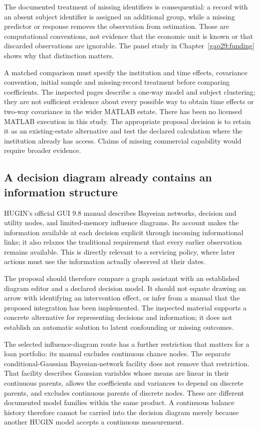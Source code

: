 The documented treatment of missing identifiers is consequential: a record
with an absent subject identifier is assigned an additional group, while a
missing predictor or response removes the observation from estimation.
Those are computational conventions, not evidence that the economic unit
is known or that discarded observations are ignorable. The panel study in
Chapter~\ref{gap29:funding} shows why that distinction matters.

A matched comparison must specify the institution and time effects,
covariance convention, initial sample and missing-record treatment before
comparing coefficients. The inspected pages describe a one-way model and
subject clustering; they are not sufficient evidence about every possible
way to obtain time effects or two-way covariance in the wider MATLAB estate.
There has been no licensed MATLAB execution in this study. The appropriate
proposal decision is to retain it as an existing-estate alternative and
test the declared calculation where the institution already has access.
Claims of missing commercial capability would require broader evidence.

\subsection{A decision diagram already contains an information structure}
HUGIN's official GUI 9.8 manual describes Bayesian networks, decision and
utility nodes, and limited-memory influence diagrams. Its account makes
the information available at each decision explicit through incoming
informational links; it also relaxes the traditional requirement that every
earlier observation remains available. This is directly relevant to a
servicing policy, where later actions must use the information actually
observed at their dates. \citep{gap29hugin}

The proposal should therefore compare a graph assistant with an established
diagram editor and a declared decision model. It should not equate drawing
an arrow with identifying an intervention effect, or infer from a manual
that the proposed integration has been implemented. The inspected material
supports a concrete alternative for representing decisions and information;
it does not establish an automatic solution to latent confounding or missing
outcomes.

The selected influence-diagram route has a further restriction that matters
for a loan portfolio: its manual excludes continuous chance nodes. The
separate conditional-Gaussian Bayesian-network facility does not remove
that restriction. That facility describes Gaussian variables whose means
are linear in their continuous parents, allows the coefficients and variances
to depend on discrete parents, and excludes continuous parents of discrete
nodes. These are different documented model families within the same
product. A continuous balance history therefore cannot be carried into the
decision diagram merely because another HUGIN model accepts a continuous
measurement. \citep{gap29hugin}

